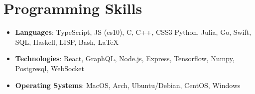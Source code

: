 \documentclass[letterpaper,8pt]{article}
\newcommand{\resumeSubHeadingListStart}{\begin{itemize}[leftmargin=*]}
\newcommand{\resumeSubHeadingListEnd}{\end{itemize}}
\begin{document}
\section{Programming Skills}
  \resumeSubHeadingListStart
    \item{
      \textbf{Languages}{: TypeScript, JS (es10), C, C++, CSS3 Python, Julia, Go, Swift, SQL, Haskell, LISP, Bash, LaTeX}
    }
    \item{
      \textbf{Technologies}{: React, GraphQL, Node.js, Express, Tensorflow, Numpy, Postgresql, WebSocket}
    }
    \item{
      \textbf{Operating Systems}{: MacOS, Arch, Ubuntu/Debian, CentOS, Windows}
    }
  \resumeSubHeadingListEnd


\end{document}
